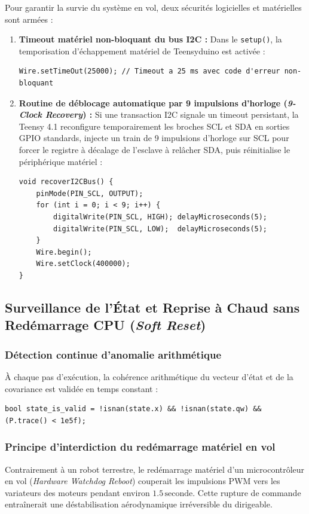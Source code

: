 \documentclass[../Implementation.tex]{subfiles}
\begin{document}
Pour garantir la survie du système en vol, deux sécurités logicielles et matérielles sont armées :
\begin{enumerate}
    \item \textbf{Timeout matériel non-bloquant du bus I2C :} 
    Dans le \lstinline|setup()|, la temporisation d'échappement matériel de Teensyduino est activée :
\begin{lstlisting}
Wire.setTimeOut(25000); // Timeout a 25 ms avec code d'erreur non-bloquant
\end{lstlisting}
    \item \textbf{Routine de déblocage automatique par 9 impulsions d'horloge (\textit{9-Clock Recovery}) :} 
    Si une transaction I2C signale un timeout persistant, la Teensy 4.1 reconfigure temporairement les broches SCL et SDA en sorties GPIO standards, injecte un train de 9 impulsions d'horloge sur SCL pour forcer le registre à décalage de l'esclave à relâcher SDA, puis réinitialise le périphérique matériel :
\begin{lstlisting}
void recoverI2CBus() {
    pinMode(PIN_SCL, OUTPUT);
    for (int i = 0; i < 9; i++) {
        digitalWrite(PIN_SCL, HIGH); delayMicroseconds(5);
        digitalWrite(PIN_SCL, LOW);  delayMicroseconds(5);
    }
    Wire.begin();
    Wire.setClock(400000);
}
\end{lstlisting}
\end{enumerate}

\subsection{Surveillance de l'État et Reprise à Chaud sans Redémarrage CPU (\textit{Soft Reset})}

\subsubsection{Détection continue d'anomalie arithmétique}
À chaque pas d'exécution, la cohérence arithmétique du vecteur d'état et de la covariance est validée en temps constant :
\begin{lstlisting}
bool state_is_valid = !isnan(state.x) && !isnan(state.qw) && (P.trace() < 1e5f);
\end{lstlisting}

\subsubsection{Principe d'interdiction du redémarrage matériel en vol}
Contrairement à un robot terrestre, le redémarrage matériel d'un microcontrôleur en vol (\textit{Hardware Watchdog Reboot}) couperait les impulsions PWM vers les variateurs des moteurs pendant environ $1.5\,\text{seconde}$. Cette rupture de commande entraînerait une déstabilisation aérodynamique irréversible du dirigeable.
\end{document}
